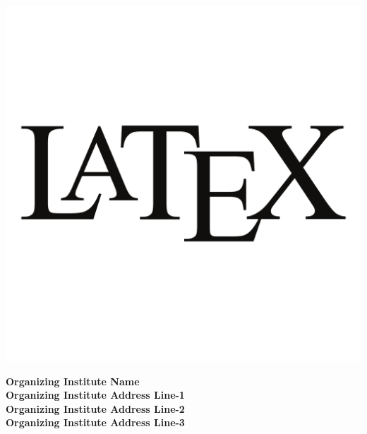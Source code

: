 \documentclass[12pt]{article}
\begin{document}
\linespread{1}\selectfont
\pagestyle{empty}

{
	\vspace*{0.5cm}
	
	\begin{minipage}[r]{1.5in}
		\centering
		\vspace{0.5cm}
		\begin{center}
			\includegraphics[scale=0.05]{latex.pdf}	
		\end{center}
	\end{minipage}
	\vspace{0.1cm}
		\begin{minipage}[r]{8in}
			\centering
			\begin{center}
				\Large{
						\textbf{\LARGE \color{blue} Organizing Institute Name}\\
						\vspace{-0.20cm}
						\textbf{\large \color{blue} Organizing Institute Address Line-1}\\
						\vspace{-0.20cm}
						\textbf{\large \color{blue} Organizing Institute Address Line-2}\\
						\vspace{-0.20cm}
						\textbf{\large \color{blue} Organizing Institute Address Line-3}
			  }
			\end{center}
		\end{minipage}
	
}
\end{document}
